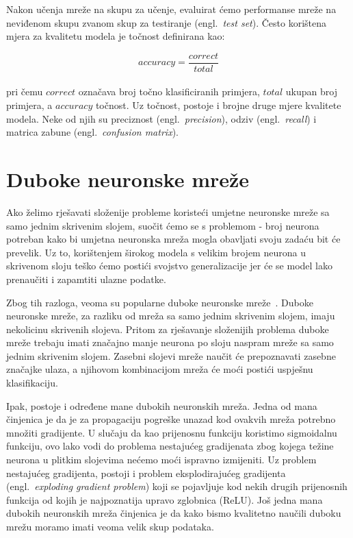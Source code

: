 \documentclass[times, utf8, zavrsni, numeric]{fer}
\begin{document}
Nakon učenja mreže na skupu za učenje, evaluirat ćemo performanse mreže na neviđenom skupu zvanom skup za testiranje (engl.\ \textit{test set}). Često korištena mjera za kvalitetu modela je točnost definirana kao:

\begin{equation}
    accuracy = \frac{correct}{total}
    \label{eq:accuracy}
\end{equation}
\\
pri čemu $correct$ označava broj točno klasificiranih primjera, $total$ ukupan broj primjera, a $accuracy$ točnost.
Uz točnost, postoje i brojne druge mjere kvalitete modela. Neke od njih su preciznost (engl.\ \textit{precision}), odziv (engl.\ \textit{recall}) i matrica zabune (engl.\ \textit{confusion matrix}).

\section{Duboke neuronske mreže}
Ako želimo rješavati složenije probleme koristeći umjetne neuronske mreže sa samo jednim skrivenim slojem, suočit ćemo se s problemom - broj neurona potreban kako bi umjetna neuronska mreža mogla obavljati svoju zadaću bit će prevelik.
Uz to, korištenjem širokog modela s velikim brojem neurona u skrivenom sloju teško ćemo postići svojstvo generalizacije jer će se model lako prenaučiti i zapamtiti ulazne podatke. 

Zbog tih razloga, veoma su popularne duboke neuronske mreže~\cite{Goodfellow-et-al-2016}. Duboke neuronske mreže, za razliku od mreža sa samo jednim skrivenim slojem, imaju nekolicinu skrivenih slojeva. 
Pritom za rješavanje složenijih problema duboke mreže trebaju imati značajno manje neurona po sloju naspram mreže sa samo jednim skrivenim slojem. 
Zasebni slojevi mreže naučit će prepoznavati zasebne značajke ulaza, a njihovom kombinacijom mreža će moći postići uspješnu klasifikaciju.

Ipak, postoje i određene mane dubokih neuronskih mreža. Jedna od mana činjenica je da je za propagaciju pogreške unazad kod ovakvih mreža potrebno množiti gradijente. 
U slučaju da kao prijenosnu funkciju koristimo sigmoidalnu funkciju, ovo lako vodi do problema nestajućeg gradijenata zbog kojega težine neurona u plitkim slojevima nećemo moći ispravno izmijeniti.
Uz problem nestajućeg gradijenta, postoji i problem eksplodirajućeg gradijenta (engl.\ \textit{exploding gradient problem}) koji se pojavljuje kod nekih drugih prijenosnih funkcija od kojih je najpoznatija upravo zglobnica (ReLU).
Još jedna mana dubokih neuronskih mreža činjenica je da kako bismo kvalitetno naučili duboku mrežu moramo imati veoma velik skup podataka.
\end{document}
